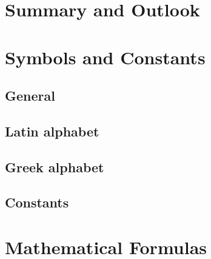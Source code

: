 \documentclass[DIV=15,
fleqn
numbers=noenddot,
headsepline,
captions=tableabove,twoside, openright]{scrreprt}
\begin{document}
\chapter{Summary and Outlook}
\begin{appendices}
\chapter{Symbols and Constants}
\section*{General}

\section*{Latin alphabet}	

\section*{Greek alphabet}	

\section*{Constants}	

\chapter{Mathematical Formulas}


\end{appendices}
\newpage




\newpage
\end{document}
